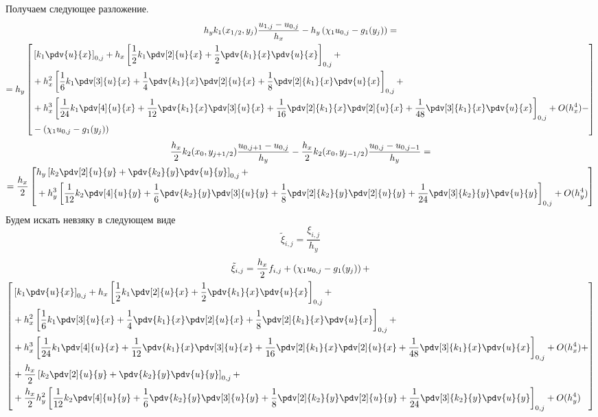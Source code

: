 Получаем следующее разложение.
\begin{multline*}
    h_y k_1(x_{1/2},y_{j}) \frac{u_{1,j} - u_{0,j}}{h_x} - h_y \left( \chi_1 u_{0,j} - g_1(y_{j}) \right) = \\
    = h_y \left[ \begin{aligned}
        & \left[ k_1 \pdv{u}{x} \right]_{0,j} +
        h_x \left[ \frac{1}{2} k_1 \pdv[2]{u}{x} + \frac{1}{2} \pdv{k_1}{x} \pdv{u}{x} \right]_{0,j} + \\
        & + h_x^2 \left[ \frac{1}{6} k_1 \pdv[3]{u}{x} + \frac{1}{4} \pdv{k_1}{x} \pdv[2]{u}{x} + \frac{1}{8} \pdv[2]{k_1}{x} \pdv{u}{x} \right]_{0,j} + \\
        & + h_x^3 \left[ \frac{1}{24} k_1 \pdv[4]{u}{x} + \frac{1}{12} \pdv{k_1}{x} \pdv[3]{u}{x} + \frac{1}{16} \pdv[2]{k_1}{x} \pdv[2]{u}{x} + \frac{1}{48} \pdv[3]{k_1}{x} \pdv{u}{x} \right]_{0,j} + O(h_x^4) - \\
        & - \left( \chi_1 u_{0,j} - g_1(y_{j}) \right)
    \end{aligned} \right]
\end{multline*}
\begin{multline*}
    \frac{h_x}{2} k_2(x_{0},y_{j+1/2}) \frac{u_{0,j+1} - u_{0,j}}{h_y} - \frac{h_x}{2} k_2(x_{0},y_{j-1/2}) \frac{u_{0,j} - u_{0,j-1}}{h_y} = \\
    = \frac{h_x}{2} \left[ \begin{aligned}
        & h_y \left[ k_2 \pdv[2]{u}{y} + \pdv{k_2}{y} \pdv{u}{y} \right]_{0,j} + \\
        & + h_y^3 \left[ \frac{1}{12} k_2 \pdv[4]{u}{y} + \frac{1}{6} \pdv{k_2}{y} \pdv[3]{u}{y} + \frac{1}{8} \pdv[2]{k_2}{y} \pdv[2]{u}{y} + \frac{1}{24} \pdv[3]{k_2}{y} \pdv{u}{y} \right]_{0,j} + O(h_y^4)
    \end{aligned} \right]
\end{multline*}
Будем искать невзяку в следующем виде
\[
    \tilde{\xi}_{i,j} = \frac{\xi_{i,j}}{h_y}
\]
\begin{multline*}
    \tilde{\xi}_{i,j} = \frac{h_x}{2} f_{i,j} + \left( \chi_1 u_{0,j} - g_1(y_{j}) \right) + \\
    \left[
    \begin{aligned}
        & \left[ k_1 \pdv{u}{x} \right]_{0,j} +
        h_x \left[ \frac{1}{2} k_1 \pdv[2]{u}{x} + \frac{1}{2} \pdv{k_1}{x} \pdv{u}{x} \right]_{0,j} + \\
        & + h_x^2 \left[ \frac{1}{6} k_1 \pdv[3]{u}{x} + \frac{1}{4} \pdv{k_1}{x} \pdv[2]{u}{x} + \frac{1}{8} \pdv[2]{k_1}{x} \pdv{u}{x} \right]_{0,j} + \\
        & + h_x^3 \left[ \frac{1}{24} k_1 \pdv[4]{u}{x} + \frac{1}{12} \pdv{k_1}{x} \pdv[3]{u}{x} + \frac{1}{16} \pdv[2]{k_1}{x} \pdv[2]{u}{x} + \frac{1}{48} \pdv[3]{k_1}{x} \pdv{u}{x} \right]_{0,j} + O(h_x^4) + \\
        & + \frac{h_x}{2} \left[ k_2 \pdv[2]{u}{y} + \pdv{k_2}{y} \pdv{u}{y} \right]_{0,j} + \\
        & + \frac{h_x}{2} h_y^2 \left[ \frac{1}{12} k_2 \pdv[4]{u}{y} + \frac{1}{6} \pdv{k_2}{y} \pdv[3]{u}{y} + \frac{1}{8} \pdv[2]{k_2}{y} \pdv[2]{u}{y} + \frac{1}{24} \pdv[3]{k_2}{y} \pdv{u}{y} \right]_{0,j} + O(h_y^4)
    \end{aligned}
    \right]
\end{multline*}
